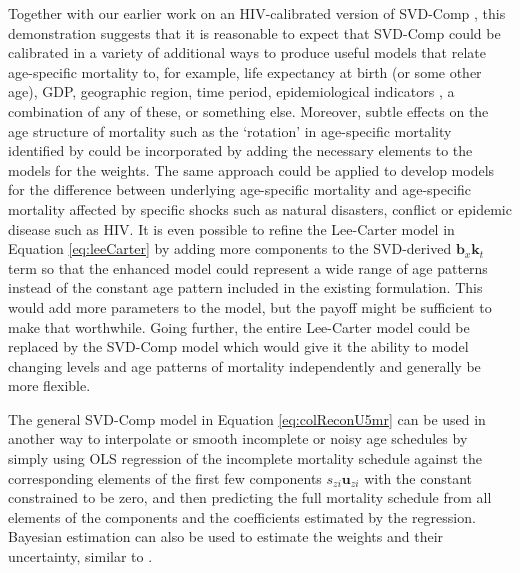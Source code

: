 \documentclass[11pt]{article}
\newcommand{\mbf}{\mathbf}
\begin{document}
Together with our earlier work on an HIV-calibrated version of SVD-Comp  \citep{sharrow2014modeling}, this demonstration suggests that it is reasonable to expect that SVD-Comp could be calibrated in a variety of additional ways to produce useful models that relate age-specific mortality to, for example, life expectancy at birth (or some other age), GDP, geographic region, time period, epidemiological indicators \citep[as in ][]{sharrow2014modeling}, a combination of any of these, or something else.  Moreover, subtle effects on the age structure of mortality such as the `rotation' in age-specific mortality identified by \cite{li2011} could be incorporated by adding the necessary elements to the models for the weights.  The same approach could be applied to develop models for the difference between underlying age-specific mortality and age-specific mortality affected by specific shocks such as natural disasters, conflict or epidemic disease such as HIV.  It is even possible to refine the Lee-Carter model in Equation \ref{eq:leeCarter} by adding more components to the SVD-derived $\mbf{b}_x\mbf{k}_t$ term so that the enhanced model could represent a wide range of age patterns instead of the constant age pattern included in the existing formulation.  This would add more parameters to the model, but the payoff might be sufficient to make that worthwhile.  Going further, the entire Lee-Carter model could be replaced by the SVD-Comp model which would give it the ability to model changing levels and age patterns of mortality independently and generally be more flexible.

The general SVD-Comp model in Equation \ref{eq:colReconU5mr} can be used in another way to interpolate or smooth incomplete or noisy age schedules by simply using OLS regression of the incomplete mortality schedule against the corresponding elements of the first few components $s_{zi}\mbf{u}_{zi}$ with the constant constrained to be zero, and then predicting the full mortality schedule from all elements of the components and the coefficients estimated by the regression.   Bayesian estimation can also be used to estimate the weights and their uncertainty, similar to \cite{Sharrow_29_39}.
\end{document}
